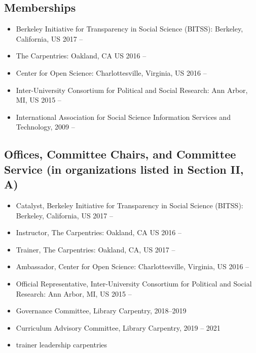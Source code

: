 \subsection{Memberships}

\begin{itemize}[label={},leftmargin=!,labelindent=5pt,itemindent=-15pt]
  \item Berkeley Initiative for Transparency in Social Science (BITSS): Berkeley, California, US 2017 --
  \item The Carpentries: Oakland, CA US 2016 --
  \item Center for Open Science: Charlottesville, Virginia, US 2016 --
  \item Inter-University Consortium for Political and Social Research: Ann Arbor, MI, US 2015 --
  \item International Association for Social Science Information Services and Technology, 2009 --
\end{itemize}

\subsection{Offices, Committee Chairs, and Committee Service (in organizations listed in Section II, A)}

\begin{itemize}[label={},leftmargin=!,labelindent=5pt,itemindent=-15pt]
 \todo add LC and trainer leadership
    \item Catalyst, Berkeley Initiative for Transparency in Social Science (BITSS): Berkeley, California, US 2017 --
    \item Instructor, The Carpentries: Oakland, CA US 2016 --
    \item Trainer, The Carpentries: Oakland, CA, US  2017 --
    \item Ambassador, Center for Open Science: Charlottesville, Virginia, US 2016 --
    \item Official Representative, Inter-University Consortium for Political and Social Research: Ann Arbor, MI, US 2015 --
    \item Governance Committee, Library Carpentry, 2018--2019
    \item Curriculum Advisory Committee, Library Carpentry, 2019 -- 2021
    \item trainer leadership carpentries
\end{itemize}

